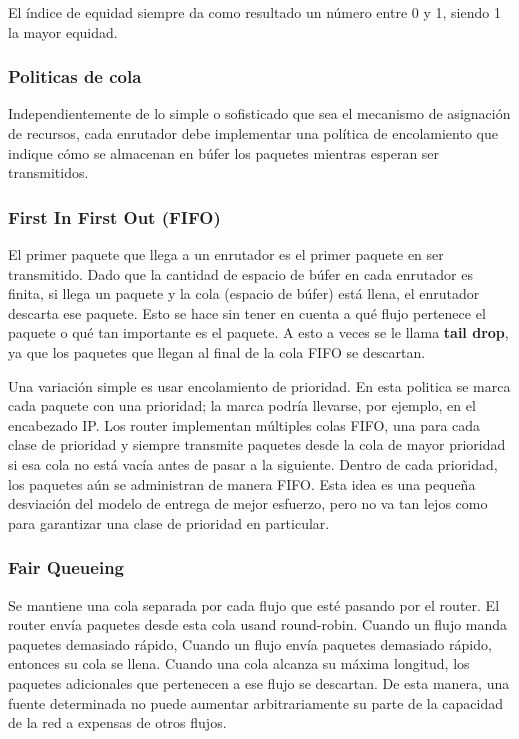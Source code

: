 El índice de equidad siempre da como resultado un número entre 0 y 1, siendo 1 la mayor equidad.

\subsubsection{Politicas de cola}
Independientemente de lo simple o sofisticado que sea el mecanismo de asignación de recursos, cada enrutador debe implementar una política de encolamiento que indique cómo se almacenan en búfer los paquetes mientras esperan ser transmitidos.

\subsubsection*{First In First Out (FIFO)}
El primer paquete que llega a un enrutador es el primer paquete en ser transmitido. Dado que la cantidad de espacio de búfer en cada enrutador es finita, si llega un paquete y la cola (espacio de búfer) está llena, el enrutador descarta ese paquete. Esto se hace sin tener en cuenta a qué flujo pertenece el paquete o qué tan importante es el paquete. A esto a veces se le llama \textbf{tail drop}, ya que los paquetes que llegan al final de la cola FIFO se descartan.

Una variación simple es usar encolamiento de prioridad. En esta politica se marca cada paquete con una prioridad; la marca podría llevarse, por ejemplo, en el encabezado IP. Los router implementan múltiples colas FIFO, una para cada clase de prioridad y siempre transmite paquetes desde la cola de mayor prioridad si esa cola no está vacía antes de pasar a la siguiente. Dentro de cada prioridad, los paquetes aún se administran de manera FIFO. Esta idea es una pequeña desviación del modelo de entrega de mejor esfuerzo, pero no va tan lejos como para garantizar una clase de prioridad en particular. 

\subsubsection*{Fair Queueing}
Se mantiene una cola separada por cada flujo que esté pasando por el router. El router envía paquetes desde esta cola usand round-robin. Cuando un flujo manda paquetes demasiado rápido, Cuando un flujo envía paquetes demasiado rápido, entonces su cola se llena. Cuando una cola alcanza su máxima longitud, los paquetes adicionales que pertenecen a ese flujo se descartan. De esta manera, una fuente determinada no puede aumentar arbitrariamente su parte de la capacidad de la red a expensas de otros flujos.

